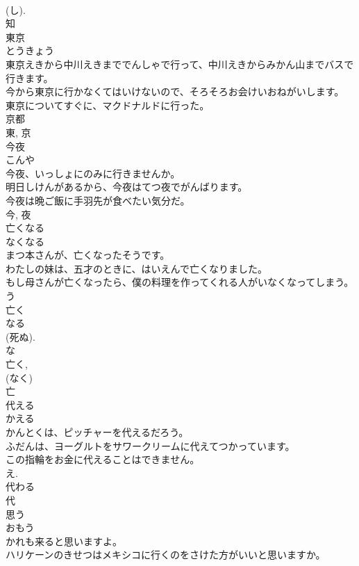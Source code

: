 \documentclass[8pt]{extreport}
\begin{document}
\begin{CJK}{UTF8}{min}
\\	(し). 
\\	知	
\\	東京	
\\	とうきょう	
\\	東京えきから中川えきまででんしゃで行って、中川えきからみかん山までバスで行きます。	
\\	今から東京に行かなくてはいけないので、そろそろお会けいおねがいします。	
\\	東京についてすぐに、マクドナルドに行った。	
\\	京都 
\\	東, 京	
\\	今夜	
\\	こんや	
\\	今夜、いっしょにのみに行きませんか。	
\\	明日しけんがあるから、今夜はてつ夜でがんばります。	
\\	今夜は晩ご飯に手羽先が食べたい気分だ。	
\\	今, 夜	
\\	亡くなる	
\\	なくなる	
\\	まつ本さんが、亡くなったそうです。	
\\	わたしの妹は、五才のときに、はいえんで亡くなりました。	
\\	もし母さんが亡くなったら、僕の料理を作ってくれる人がいなくなってしまう。	
\\	う 
\\	亡く 
\\	なる 
\\	(死ぬ).
\\	な 
\\	亡く, 
\\	(なく) 
\\	亡	
\\	代える	
\\	かえる	
\\	かんとくは、ピッチャーを代えるだろう。	
\\	ふだんは、ヨーグルトをサワークリームに代えてつかっています。	
\\	この指輪をお金に代えることはできません。	
\\	え. 
\\	代わる 
\\	代	
\\	思う	
\\	おもう	
\\	かれも来ると思いますよ。	
\\	ハリケーンのきせつはメキシコに行くのをさけた方がいいと思いますか。	

\end{CJK}
\end{document}
